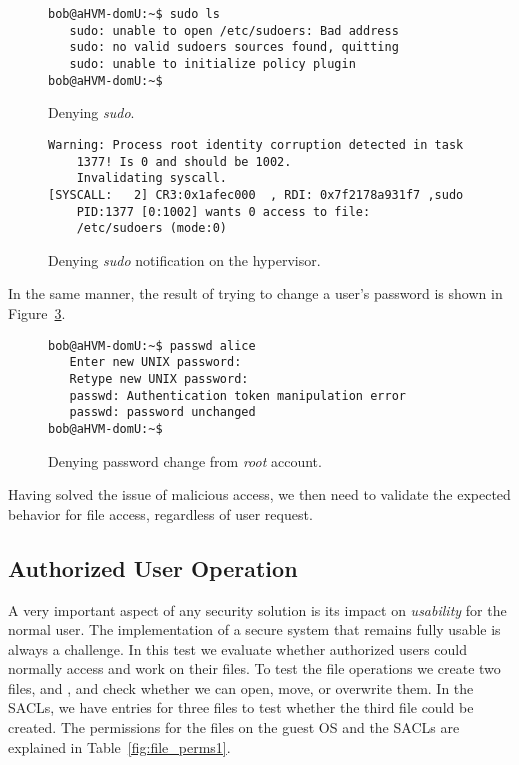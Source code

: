 \begin{figure}[ht]
	\centering
	\footnotesize{\selectfont 
		\begin{lstlisting}
bob@aHVM-domU:~$ sudo ls
   sudo: unable to open /etc/sudoers: Bad address
   sudo: no valid sudoers sources found, quitting
   sudo: unable to initialize policy plugin
bob@aHVM-domU:~$
		\end{lstlisting}}
	\caption{Denying \emph{sudo}.}
	\label{fig:sudo_deny}
\end{figure}

\begin{figure}[ht]
	\centering
	\footnotesize{\selectfont 
		\begin{lstlisting}
Warning: Process root identity corruption detected in task 
	1377! Is 0 and should be 1002. 
	Invalidating syscall.
[SYSCALL:   2] CR3:0x1afec000  , RDI: 0x7f2178a931f7 ,sudo 
	PID:1377 [0:1002] wants 0 access to file: 
	/etc/sudoers (mode:0)
		\end{lstlisting}}
	\caption{Denying \emph{sudo} notification on the hypervisor.}
	\label{fig:sudo_deny_not}
\end{figure}

\par In the same manner, the result of trying to change a user's password is shown in Figure~\ref{fig:passwd_deny}.

\begin{figure}[ht]
	\centering
	\footnotesize{\selectfont 
		\begin{lstlisting}
bob@aHVM-domU:~$ passwd alice
   Enter new UNIX password:
   Retype new UNIX password:
   passwd: Authentication token manipulation error
   passwd: password unchanged
bob@aHVM-domU:~$
		\end{lstlisting}}
	\caption{Denying password change from \emph{root} account.}
	\label{fig:passwd_deny}
\end{figure}


\par Having solved the issue of malicious  access, we then need to validate the expected behavior for file access, regardless of  user request.

\subsection{Authorized User Operation}

\par A very important aspect of any security solution is its impact on \emph{usability} for the normal user. The implementation of a secure system that remains fully usable is always a challenge. In this test we evaluate whether authorized users could normally access and work on their files. To test the file operations we create two files,  and , and check whether we can open, move, or overwrite them. In the \acp{SACL}, we have entries for three files to test whether the third file could be created. The permissions for the files on the guest \ac{OS} and the \acp{SACL} are explained in Table~\ref{fig:file_perms1}.

